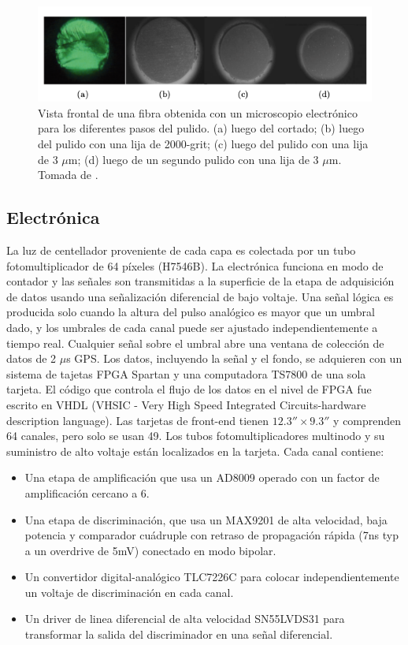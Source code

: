 \documentclass[a4paper,10pt]{article}
\numberwithin{equation}{section}
\begin{document}
\begin{figure}[H]
 \center 
 \includegraphics[scale=0.7]{fig4}
 \caption{Vista frontal de una fibra obtenida con un microscopio electrónico para 
 los diferentes pasos del pulido. (a) luego del cortado; (b) luego del pulido con una 
 lija de 2000-grit; (c) luego del pulido con una lija de 3 $\mu$m; (d) luego de un segundo 
 pulido con una lija de 3 $\mu$m. Tomada de \cite{trovato}.}
\end{figure}

\subsection{Electrónica}

La luz de centellador proveniente de cada capa es colectada por un tubo fotomultiplicador 
de 64 píxeles (H7546B). La electrónica funciona en modo de contador y las señales 
son transmitidas a la superficie de la etapa de adquisición de datos usando una 
señalización diferencial de bajo voltaje. Una señal lógica es producida solo 
cuando la altura del pulso analógico es mayor que un umbral dado, y los umbrales 
de cada canal puede ser ajustado independientemente a tiempo real. Cualquier señal 
sobre el umbral abre una ventana de colección de datos de 2 $\mu$s GPS. Los datos, 
incluyendo la señal y el fondo, se adquieren con un sistema de tajetas FPGA Spartan 
y una computadora TS7800 de una sola tarjeta. El código que controla el flujo de los 
datos en el nivel de FPGA fue escrito en VHDL (VHSIC - Very High Speed Integrated 
Circuits-hardware description language). Las tarjetas de front-end tienen 
$12.3'' \times 9.3''$ y comprenden 64 canales, pero solo se usan 49. Los tubos 
fotomultiplicadores multinodo y su suministro de alto voltaje están localizados en 
la tarjeta. Cada canal contiene: 

\begin{itemize}
 \item Una etapa de amplificación que usa un AD8009 operado con un factor de 
 amplificación cercano a 6.
 \item Una etapa de discriminación, que usa un MAX9201 de alta velocidad, baja 
 potencia y comparador cuádruple con retraso de propagación rápida (7ns typ a 
 un overdrive de 5mV) conectado en modo bipolar.
 \item Un convertidor digital-analógico TLC7226C para colocar independientemente un 
 voltaje de discriminación en cada canal.
 \item Un driver de linea diferencial de alta velocidad SN55LVDS31 para transformar 
 la salida del discriminador en una señal diferencial.
\end{itemize}
\end{document}
